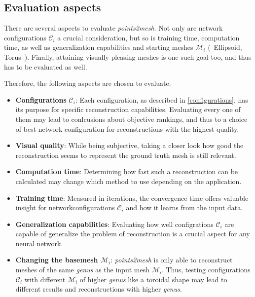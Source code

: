 \subsection{Evaluation aspects}
    There are several aspects to evaluate \emph{points2mesh}. Not only are network configurations $\mathcal{C}_i$ a crucial consideration,
    but so is training time, computation time, as well as generalization capabilities and starting meshes $\mathcal{M}_i$ (~Ellipsoid, Torus~). Finally,
    attaining visually pleasing meshes is one such goal too, and thus has to be evaluated as well.

    Therefore, the following aspects are chosen to evaluate.
    \begin{itemize}
        \item \textbf{Configurations} $\mathcal{C}_i$: Each configuration, as described in \ref{configurations}, has its purpose 
                for specific reconstruction capabilities. Evaluating every one of them may lead to conlcusions about objective rankings, and thus
                to a choice of best network configuration for reconstructions with the highest quality.
        \item \textbf{Visual quality}: While being subjective, taking a closer look how good the reconstruction seems to represent the ground truth mesh
        is still relevant.
        \item \textbf{Computation time}: Determining how fast such a reconstruction can be calculated may change which method to use depending on the application.
        \item \textbf{Training time}: Measured in iterations, the convergence time offers valuable insight for networkconfigurations $\mathcal{C}_i$ and how it
        learns from the input data.
        \item \textbf{Generalization capabilities}: Evaluating how well configrations $\mathcal{C}_i$ are capable of generalize the problem of reconstruction is a crucial aspect
        for any neural network. 
        \item \textbf{Changing the basemesh $\mathcal{M}_i$}: \emph{points2mesh} is only able to reconstruct meshes of the same \emph{genus} as the input mesh $\mathcal{M}_i$.
        Thus, testing configurations $\mathcal{C}_i$ with different $\mathcal{M}_i$ of higher \emph{genus} like a toroidal shape may lead to different results and 
        reconstructions with higher \emph{genus}.
    \end{itemize}

